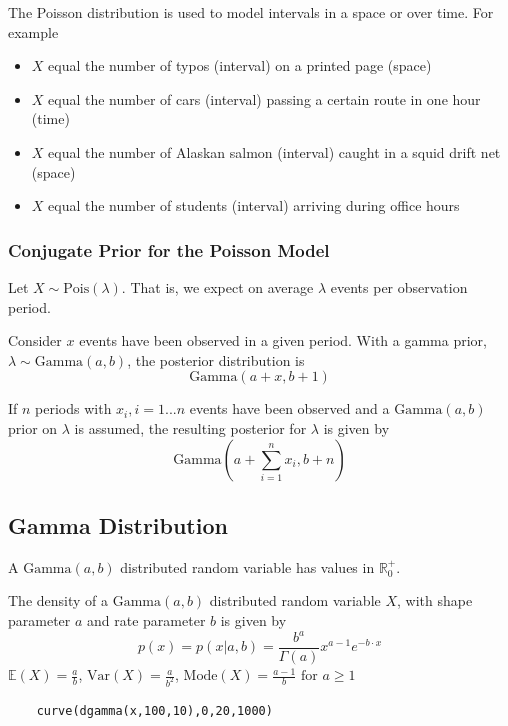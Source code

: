 \documentclass[11pt]{article}
\begin{document}
The Poisson distribution is used to model intervals in a space or over time. For example
\begin{itemize}
	\item $X$ equal the number of typos (interval) on a printed page (space)
	\item $X$ equal the number of cars (interval) passing a certain route in one hour (time)
	\item $X$ equal the number of Alaskan salmon (interval) caught in a squid drift net (space)
	\item $X$ equal the number of students (interval) arriving during office hours
\end{itemize}

\subsubsection{Conjugate Prior for the Poisson Model}
Let $X\sim \text{Pois}(\lambda)$. That is, we expect on average $\lambda$ events per observation period. 

Consider $x$ events have been observed in a given period. With a gamma prior, $\lambda \sim \text{Gamma}(a,b)$, the posterior distribution is
\begin{equation*}
	\text{Gamma}(a + x, b + 1)
\end{equation*}

If $n$ periods with $x_i, i=1...n$ events have been observed and a
$\text{Gamma}(a,b)$ prior on $\lambda$ is assumed, the resulting posterior for $\lambda$ is given by
\begin{equation*}
	\text{Gamma}(a+\sum_{i=1}^{n}x_i, b+n)
\end{equation*}

\subsection{Gamma Distribution}
A $\text{Gamma}(a,b)$ distributed random variable has values in $\mathbb{R}_0^+$.

The density of a $\text{Gamma}(a,b)$ distributed random variable $X$, with shape parameter $a$ and rate parameter $b$ is given by
\begin{equation*}
	p(x) = p(x|a,b) = \frac{b^a}{\Gamma(a)}x^{a-1}e^{-b\cdot x}
\end{equation*}
\noindent
$\mathbb{E}(X)=\frac{a}{b}$, $\text{Var}(X) = \frac{a}{b^2}$, $\text{Mode}(X) = \frac{a-1}{b}\text{ for }a\geq 1$
\begin{verbatim}
	curve(dgamma(x,100,10),0,20,1000)
\end{verbatim}
\end{document}
